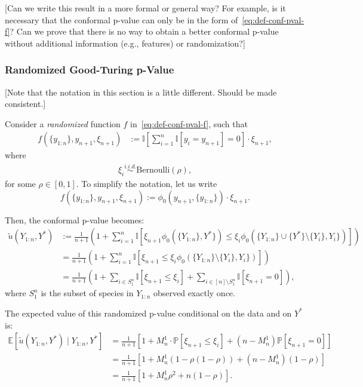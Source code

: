 \documentclass[11pt]{article}
\renewcommand{\P}[1]{\mathbb{P}\left[#1\right]}
\newcommand{\E}[1]{\mathbb{E}\left[#1\right]}
\newcommand{\I}[1]{\mathbb{I}\left[#1\right]}
\begin{document}
{\color{red}[Can we write this result in a more formal or general way? For example, is it necessary that the conformal p-value can only be in the form of~\eqref{eq:def-conf-pval-f}? Can we prove that there is no way to obtain a better conformal p-value without additional information (e.g., features) or randomization?] } 


\subsubsection{Randomized Good-Turing p-Value}

{\color{red}[Note that the notation in this section is a little different. Should be made consistent.]}

Consider a {\em randomized} function $f$ in~\eqref{eq:def-conf-pval-f}, such that
\begin{align} \label{eq:def-f-randomized}
  f(\{y_{1:n}\}, y_{n+1}, \xi_{n+1})
  & := \I{\sum_{i=1}^{n} \I{y_i = y_{n+1}}=0} \cdot \xi_{n+1},
\end{align}
where
\begin{align*}
  \xi_i \overset{i.i.d.}{\sim} \text{Bernoulli}(\rho),
\end{align*}
for some $\rho \in [0,1]$.
To simplify the notation, let us write
$$f(\{y_{1:n}\}, y_{n+1}, \xi_{n+1}) := \phi_0(y_{n+1}, \{y_{1:n}\}) \cdot \xi_{n+1}.$$

Then, the conformal p-value becomes:
\begin{align*}
  \tilde{u}(Y_{1:n}, Y^*)
  & := \frac{1}{n+1} \left( 1 + \sum_{i=1}^{n} \I{ \xi_{n+1} \phi_0(\{Y_{1:n}\}, Y^*\}) \leq \xi_{i} \phi_0(\{Y_{1:n}\} \cup \{Y^*\} \setminus \{Y_i\}, Y_{i}\}) } \right) \\
  & = \frac{1}{n+1} \left( 1 + \sum_{i=1}^{n} \I{ \xi_{n+1} \leq \xi_{i} \phi_0(\{Y_{1:n}\} \setminus \{Y_i\}, Y_{i}\}) } \right) \\
  & = \frac{1}{n+1} \left( 1 + \sum_{i \in S^n_1} \I{\xi_{n+1} \leq \xi_{i}} + \sum_{i \in [n] \setminus S^n_1} \I{\xi_{n+1} = 0} \right),
\end{align*}
where $S^n_1$ is the subset of species in $Y_{1:n}$ observed exactly once.

 The expected value of this randomized p-value conditional on the data and on $Y^*$ is:
 \begin{align*}
   \E{\tilde{u}(Y_{1:n}, Y^*) \mid Y_{1:n}, Y^*}
   & = \frac{1}{n+1} \left[ 1 + M_n^1 \cdot \P{\xi_{n+1} \leq \xi_{i}} + (n-M_n^1) \P{\xi_{n+1} = 0} \right] \\
   & = \frac{1}{n+1} \left[ 1 + M_n^1 (1 - \rho(1-\rho)) + (n-M_n^1)(1-\rho) \right] \\
   & = \frac{1}{n+1} \left[ 1 + M_n^1 \rho^2 + n(1-\rho) \right].
 \end{align*}
\end{document}

